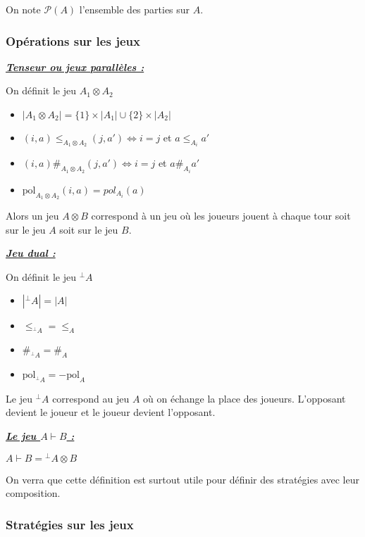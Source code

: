 \documentclass[a4paper,12ptCOUCOU
]{article}
\newlength{\mydepth}
\newlength{\myheight}
\newenvironment{answer}[1]
{\vspace{0.5cm}\begin{minipage}{\linewidth}\textbf{\textit{\underline{#1}}}\par\begin{lrbox}{\mybox}\quad\begin{minipage}{\linewidth}\color{black}\setlength{\parskip}{10pt}}
{\end{minipage}\end{lrbox}
\settodepth{\mydepth}{\usebox{\mybox}}
\settoheight{\myheight}{\usebox{\mybox}}
\addtolength{\myheight}{\mydepth}
\noindent\makebox[0pt]{
  \color{gray}\hspace{-0pt}\rule[-\mydepth]{1pt}{\myheight}}
\usebox{\mybox}
\end{minipage}
  }
\begin{document}
On note $\mathcal{P}(A)$ l'ensemble des parties sur $A$.

\subsubsection{Opérations sur les jeux}

\begin{answer}{Tenseur ou jeux parallèles :}
On définit le jeu $A_1 \otimes A_2$
\begin{itemize}
\item $|A_1 \otimes A_2| = \{1\} \times |A_1| \cup \{2\} \times |A_2|$
\item $(i,a) \leq_{A_1 \otimes A_2} (j, a') \iff i = j $ et $a \leq_{A_i} a'$
\item $(i,a) \#_{A_1 \otimes A_2} (j,a') \iff i = j$ et $a \#_{A_i} a'$
\item $\text{pol}_{A_1 \otimes A_2}(i,a) = pol_{A_i} (a)$
\end{itemize}
\end{answer}

Alors un jeu $A\otimes B$ correspond à un jeu où les joueurs jouent
à chaque tour soit sur le jeu $A$ soit sur le jeu $B$.

\begin{answer}{Jeu dual :}
On définit le jeu ${}^\bot A$
\begin{itemize}
\item $|{}^\bot A| = |A|$
\item $\leq_{{}^\bot A} = \leq_A$
\item $\#_{{}^\bot A} = \#_A$
\item $\text{pol}_{{}^\bot A} = - \text{pol}_A$
\end{itemize}
\end{answer}

Le jeu ${}^\bot A$ correspond au jeu $A$ où on échange la place des joueurs.
L'opposant devient le joueur et le joueur devient l'opposant.

\begin{answer}{Le jeu $A \vdash B$ :}
$A \vdash B = {}^\bot A \otimes B$
\end{answer}

On verra que cette définition est surtout utile pour définir des stratégies
avec leur composition.

\subsubsection{Stratégies sur les jeux}
\end{document}
